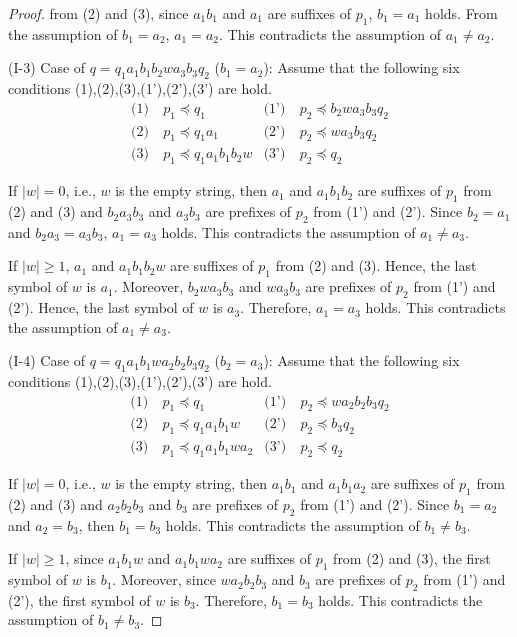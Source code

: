 \begin{proof}
\noindent
from (2) and (3), since $a_{1}b_{1}$ and $a_{1}$ are suffixes of $p_{1}$, 
$b_{1} = a_{1}$ holds.
From the assumption of $b_{1}=a_{2}$, $a_{1}=a_{2}$.
This contradicts the assumption of $a_{1}\not= a_{2}$.
\smallskip

\noindent
(I-3) Case of $q=q_{1}a_{1}b_{1}b_{2}wa_{3}b_{3}q_{2}$ ($b_{1}=a_{2}$):
Assume that the following six conditions (1),(2),(3),(1'),(2'),(3') are hold.
\begin{align*}
\textrm{(1)}~& p_{1} \preceq q_{1} & \textrm{(1')}~& p_{2} \preceq b_{2}wa_{3}b_{3}q_{2} \\
\textrm{(2)}~& p_{1} \preceq q_{1}a_{1} & \textrm{(2')}~& p_{2} \preceq wa_{3}b_{3}q_{2} \\
\textrm{(3)}~& p_{1} \preceq q_{1}a_{1}b_{1}b_{2}w & \textrm{(3')}~& p_{2} \preceq q_{2}
\end{align*}

If $|w|=0$, i.e., $w$ is the empty string, then $a_{1}$ and $a_{1}b_{1}b_{2}$ are suffixes of $p_{1}$ from (2) and (3)
and $b_{2}a_{3}b_{3}$ and $a_{3}b_{3}$ are prefixes of $p_{2}$ from (1') and (2').
Since $b_{2}=a_{1}$ and $b_{2}a_{3}=a_{3}b_{3}$, $a_{1}=a_{3}$ holds.
This contradicts the assumption of $a_{1}\not= a_{3}$.

If $|w| \ge 1$, $a_{1}$ and $a_{1}b_{1}b_{2}w$ are suffixes of $p_{1}$ from (2) and (3).
Hence, the last symbol of $w$ is $a_{1}$.
Moreover, $b_{2}wa_{3}b_{3}$ and $wa_{3}b_{3}$ are prefixes of $p_{2}$ from (1') and (2').
Hence, the last symbol of $w$ is $a_{3}$.
Therefore, $a_{1}=a_{3}$ holds.
This contradicts the assumption of $a_{1} \ne a_{3}$.
\smallskip

\noindent
(I-4) Case of $q=q_{1}a_{1}b_{1}wa_{2}b_{2}b_{3}q_{2}$ ($b_{2}=a_{3}$):
Assume that the following six conditions (1),(2),(3),(1'),(2'),(3') are hold.
\begin{align*}
\textrm{(1)}~& p_{1} \preceq q_{1} & \textrm{(1')}~& p_{2} \preceq wa_{2}b_{2}b_{3}q_{2} \\
\textrm{(2)}~& p_{1} \preceq q_{1}a_{1}b_{1}w & \textrm{(2')}~& p_{2} \preceq b_{3}q_{2} \\
\textrm{(3)}~& p_{1} \preceq q_{1}a_{1}b_{1}wa_{2} & \textrm{(3')}~& p_{2} \preceq q_{2}
\end{align*}
\noindent

If $|w|=0$, i.e., $w$ is the empty string, then $a_{1}b_{1}$ and $a_{1}b_{1}a_{2}$ are suffixes of $p_{1}$ from (2) and (3)
and $a_{2}b_{2}b_{3}$ and $b_{3}$ are prefixes of $p_{2}$ from (1') and (2').
Since $b_{1}=a_{2}$ and $a_{2}=b_{3}$, then $b_{1}=b_{3}$ holds.
This contradicts the assumption of $b_{1}\not= b_{3}$.

If $|w| \ge 1$, since $a_{1}b_{1}w$ and $a_{1}b_{1}wa_{2}$ are suffixes of $p_{1}$ from (2) and (3), the first symbol of $w$ is $b_{1}$.
Moreover, since $wa_{2}b_{2}b_{3}$ and $b_{3}$ are prefixes of $p_{2}$ from (1') and (2'),
the first symbol of $w$ is $b_{3}$.
Therefore, $b_{1}=b_{3}$ holds.
This contradicts the assumption of $b_{1} \ne b_{3}$.
\end{proof}

